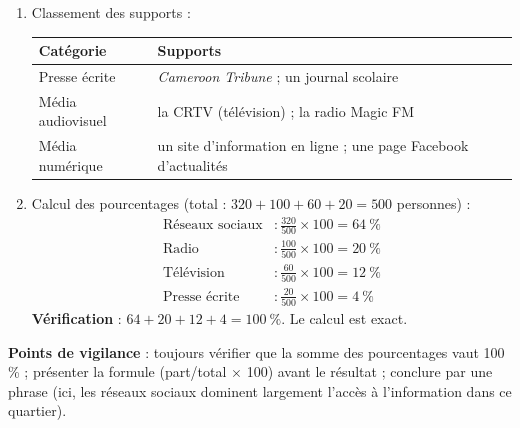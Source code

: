 \documentclass[11pt]{article}
\begin{document}
\begin{corrige}
\begin{enumerate}
\item Classement des supports :
\begin{center}
\begin{tabularx}{\linewidth}{|l|X|}\hline
\rowcolor{popblueL} \textbf{Catégorie} & \textbf{Supports} \\ \hline
Presse écrite & \emph{Cameroon Tribune} ; un journal scolaire \\ \hline
Média audiovisuel & la CRTV (télévision) ; la radio Magic FM \\ \hline
Média numérique & un site d'information en ligne ; une page Facebook d'actualités \\ \hline
\end{tabularx}
\end{center}
\item Calcul des pourcentages (total : $320 + 100 + 60 + 20 = 500$ personnes) :
\begin{align*}
\text{Réseaux sociaux} &: \frac{320}{500}\times 100 = 64\ \%\\
\text{Radio} &: \frac{100}{500}\times 100 = 20\ \%\\
\text{Télévision} &: \frac{60}{500}\times 100 = 12\ \%\\
\text{Presse écrite} &: \frac{20}{500}\times 100 = 4\ \%
\end{align*}
\textbf{Vérification} : $64 + 20 + 12 + 4 = 100\ \%$. Le calcul est exact.
\end{enumerate}
\textbf{Points de vigilance} : toujours vérifier que la somme des pourcentages vaut 100 \% ; présenter la formule (part/total $\times$ 100) avant le résultat ; conclure par une phrase (ici, les réseaux sociaux dominent largement l'accès à l'information dans ce quartier).
\end{corrige}
\end{document}
